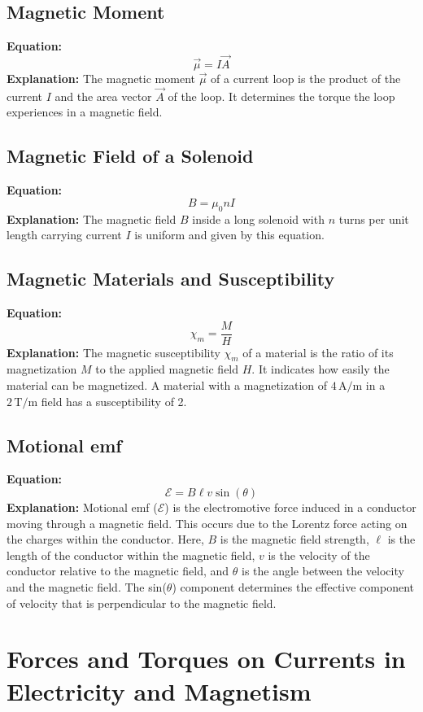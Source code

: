 \documentclass{article}
\begin{document}
\subsection*{Magnetic Moment}
\textbf{Equation:} 
\[ \vec{\mu} = I\vec{A} \]
\textbf{Explanation:} 
The magnetic moment \( \vec{\mu} \) of a current loop is the product of the current \( I \) and the area vector \( \vec{A} \) of the loop. It determines the torque the loop experiences in a magnetic field.

\subsection*{Magnetic Field of a Solenoid}
\textbf{Equation:} 
\[ B = \mu_0 n I \]
\textbf{Explanation:} 
The magnetic field \( B \) inside a long solenoid with \( n \) turns per unit length carrying current \( I \) is uniform and given by this equation.

\subsection*{Magnetic Materials and Susceptibility}
\textbf{Equation:} 
\[ \chi_m = \frac{M}{H} \]
\textbf{Explanation:} 
The magnetic susceptibility \( \chi_m \) of a material is the ratio of its magnetization \( M \) to the applied magnetic field \( H \). It indicates how easily the material can be magnetized.
A material with a magnetization of \( 4 \, \text{A/m} \) in a \( 2 \, \text{T/m} \) field has a susceptibility of 2.

\subsection*{Motional emf}
\textbf{Equation:} 
\[ \mathcal{E} = B \ell v \sin(\theta) \]
\textbf{Explanation:} 
Motional emf (\( \mathcal{E} \)) is the electromotive force induced in a conductor moving through a magnetic field. This occurs due to the Lorentz force acting on the charges within the conductor. Here, \( B \) is the magnetic field strength, \( \ell \) is the length of the conductor within the magnetic field, \( v \) is the velocity of the conductor relative to the magnetic field, and \( \theta \) is the angle between the velocity and the magnetic field. The sin(\( \theta \)) component determines the effective component of velocity that is perpendicular to the magnetic field.

\section*{Forces and Torques on Currents in Electricity and Magnetism}
\end{document}
